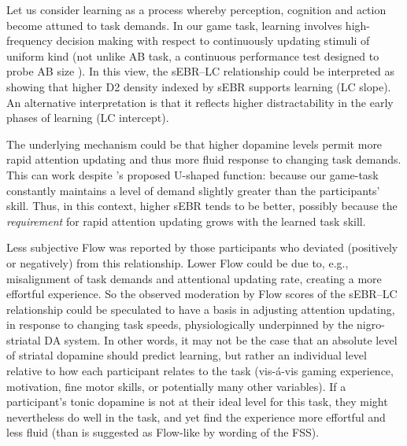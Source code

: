 \documentclass[a4paper,doc,floatsintext,natbib,10pt]{apa6}
\begin{document}
Let us consider learning as a process whereby perception, cognition and action become attuned to task demands. In our game task, learning involves high-frequency decision making with respect to continuously updating stimuli of uniform kind (not unlike AB task, a continuous performance test designed to probe AB size \citep{Slagter2012}). In this view, the sEBR--LC relationship could be interpreted as showing that higher D2 density indexed by sEBR supports learning (LC slope). An alternative interpretation is that it reflects higher distractability in the early phases of learning (LC intercept).

The underlying mechanism could be that higher dopamine levels permit more rapid attention updating and thus more fluid response to changing task demands. This can work despite \cite{Slagter2012}'s proposed U-shaped function: because our game-task constantly maintains a level of demand slightly greater than the participants' skill. Thus, in this context, higher sEBR tends to be better, possibly because the {\it requirement} for rapid attention updating grows with the learned task skill.

Less subjective Flow was reported by those participants who deviated (positively or negatively) from this relationship. Lower Flow could be due to, e.g., misalignment of task demands and attentional updating rate, creating a more effortful experience. So the observed moderation by Flow scores of the sEBR--LC relationship could be speculated to have a basis in adjusting attention updating, in response to changing task speeds, physiologically underpinned by the nigro-striatal DA system. In other words, it may not be the case that an absolute level of striatal dopamine should predict learning, but rather an individual level relative to how each participant relates to the task (vis-\'{a}-vis gaming experience, motivation, fine motor skills, or potentially many other variables). If a participant's tonic dopamine is not at their ideal level for this task, they might nevertheless do well in the task, and yet find the experience more effortful and less fluid (than is suggested as Flow-like by wording of the FSS).
\end{document}
